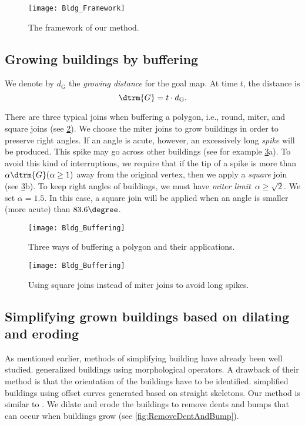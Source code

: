 \begin{figure}[tb]
	\centering
	\texttt{[image: Bldg\_Framework]}
	\caption{The framework of our method.}
	\label{fig:Bldg_Framework}
\end{figure}


\subsection{Growing buildings by buffering}
\label{sec:Grow}
We denote by $d_\mathrm{G}$ 
the \emph{growing distance} for the goal map.
At time $t$, the distance is
\begin{equation}
\label{eq:d_Gt}
\dtrm{G} = t \cdot d_\mathrm{G}.
\end{equation}

There are three typical joins when buffering a polygon, i.e.,
round, miter, and square joins
(see \fig\ref{fig:Buffer_ThreeKinds}).
We choose the miter joins to grow buildings in order to
preserve right angles.
If an angle is acute, however, 
an excessively long \emph{spike} will be produced.
This spike may go across other buildings 
(see for example \fig\ref{fig:Buffer_MiterLimits}a).
To avoid this kind of interruptions, 
we require that if the tip of a spike 
is more than $\alpha \dtrm{G} (\alpha \ge 1)$
away from the original vertex, 
then we apply a \emph{square} join
(see \fig\ref{fig:Buffer_MiterLimits}b).
To keep right angles of buildings, 
we must have \emph{miter limit}~$\alpha \geq \sqrt{2}$. 
We set $\alpha  = 1.5$. 
In this case, a square join will be applied 
when an angle is smaller (more acute) than $83.6 \degree$.

\begin{figure}[tb]
	\centering
	\texttt{[image: Bldg\_Buffering]}
	\caption{Three ways of buffering a polygon and 
		their applications.}
	\label{fig:Buffer_ThreeKinds}
\end{figure}

\begin{figure}[tb]
	\centering
	\texttt{[image: Bldg\_Buffering]}
	\caption{Using square joins instead of miter joins to avoid 
	long spikes.
	}
	\label{fig:Buffer_MiterLimits}
\end{figure}




\subsection{Simplifying grown buildings based on dilating and 
eroding}
\label{sec:DilationErosion}
As mentioned earlier, 
methods of simplifying building have already been well studied. \citet{Damen2008} generalized buildings using 
morphological operators.
A drawback of their method is that the orientation of the 
buildings have to be identified.
\citet{Meijers2016} simplified buildings 
using offset curves generated based on straight skeletons.
Our method is similar to \citet{Meijers2016}.
We dilate and erode the buildings to remove dents and 
bumps that can occur when buildings grow
(see \fig\ref{fig:RemoveDentAndBump}).


